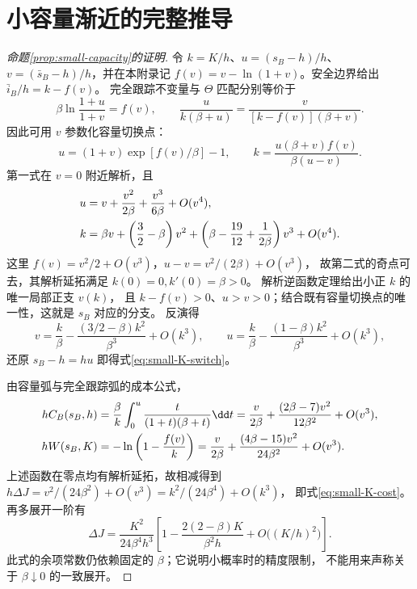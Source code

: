 \section{小容量渐近的完整推导}
\label{app:small-capacity-proof}
\begin{proof}[命题\ref{prop:small-capacity}的证明]
令 $k=K/h$、$u=(s_B-h)/h$、$v=(\bar s_B-h)/h$，并在本附录记
$f(v)=v-\ln(1+v)$。安全边界给出 $\bar i_B/h=k-f(v)$。
完全跟踪不变量与 $\Theta$ 匹配分别等价于
\begin{equation}
 \beta\ln\frac{1+u}{1+v}=f(v),\qquad
 \frac{u}{k(\beta+u)}=
 \frac{v}{[k-f(v)](\beta+v)}.
 \label{eq:small-K-endpoint-match}
\end{equation}
因此可用 $v$ 参数化容量切换点：
\begin{equation}
 u=(1+v)\exp[f(v)/\beta]-1,\qquad
 k=\frac{u(\beta+v)f(v)}{\beta(u-v)}.
 \label{eq:small-K-parametrization}
\end{equation}
第一式在 $v=0$ 附近解析，且
\begin{align}
 u&=v+\frac{v^2}{2\beta}+\frac{v^3}{6\beta}+O(v^4),\notag\\
 k&=\beta v+\left(\frac32-\beta\right)v^2
   +\left(\beta-\frac{19}{12}+\frac1{2\beta}\right)v^3+O(v^4).
 \label{eq:small-K-param-series}
\end{align}
这里 $f(v)=v^2/2+O(v^3)$，$u-v=v^2/(2\beta)+O(v^3)$，
故第二式的奇点可去，其解析延拓满足 $k(0)=0,k'(0)=\beta>0$。
解析逆函数定理给出小正 $k$ 的唯一局部正支 $v(k)$，
且 $k-f(v)>0$、$u>v>0$；结合既有容量切换点的唯一性，这就是 $s_B$ 对应的分支。
反演得
\begin{equation}
 v=\frac k\beta-\frac{(3/2-\beta)k^2}{\beta^3}+O(k^3),\qquad
 u=\frac k\beta-\frac{(1-\beta)k^2}{\beta^3}+O(k^3),
 \label{eq:small-K-inverse}
\end{equation}
还原 $s_B-h=hu$ 即得式\eqref{eq:small-K-switch}。

由容量弧与完全跟踪弧的成本公式，
\begin{align}
 hC_B(s_B,h)
 &=\frac\beta k\int_0^u\frac{t}{(1+t)(\beta+t)}\dd t
 =\frac v{2\beta}+\frac{(2\beta-7)v^2}{12\beta^2}+O(v^3),\notag\\
 hW(s_B,K)
 &=-\ln\left(1-\frac{f(v)}k\right)
 =\frac v{2\beta}+\frac{(4\beta-15)v^2}{24\beta^2}+O(v^3).
 \label{eq:small-K-cost-series}
\end{align}
上述函数在零点均有解析延拓，故相减得到
$h\Delta J=v^2/(24\beta^2)+O(v^3)=k^2/(24\beta^4)+O(k^3)$，
即式\eqref{eq:small-K-cost}。
再多展开一阶有
\begin{equation}
 \Delta J=\frac{K^2}{24\beta^4h^3}
 \left[1-\frac{2(2-\beta)K}{\beta^2h}
       +O\bigl((K/h)^2\bigr)\right].
 \label{eq:small-K-precision}
\end{equation}
此式的余项常数仍依赖固定的 $\beta$；它说明小概率时的精度限制，
不能用来声称关于 $\beta\downarrow0$ 的一致展开。


\end{proof}
